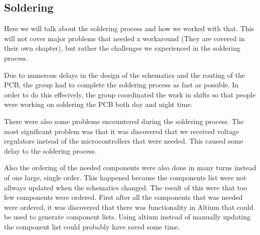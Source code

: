 \subsection{Soldering} \label{pcb:process:ss:soldering}

Here we will talk about the soldering process and how we worked with that.
This will not cover major problems that needed a workaround (They are covered in their own chapter), but rather the challenges we experienced in the soldering process.

Due to numerous delays in the design of the schematics and the routing of the PCB, the group had to complete the soldering process as fast as possible.
In order to do this effecively, the group coordinated the work in shifts so that people were working on soldering the PCB both day and night time.

There were also some problems encountered during the soldering process. The most significant problem was that it was discovered that
we received voltage regulators instead of the microcontrollers that were needed. This caused some delay to the soldering process.

Also the ordering of the needed components were also done in many turns instead of one large, single order.
This happened because the components list were not allways updated when the schematics changed. The result of this were
that too few components were ordered. First after all the components that was needed were ordered, it was discovered that there was functionality in Altium that could be used
to generate component lists. Using altium instead of manually updating the component list could probably have saved some time.


